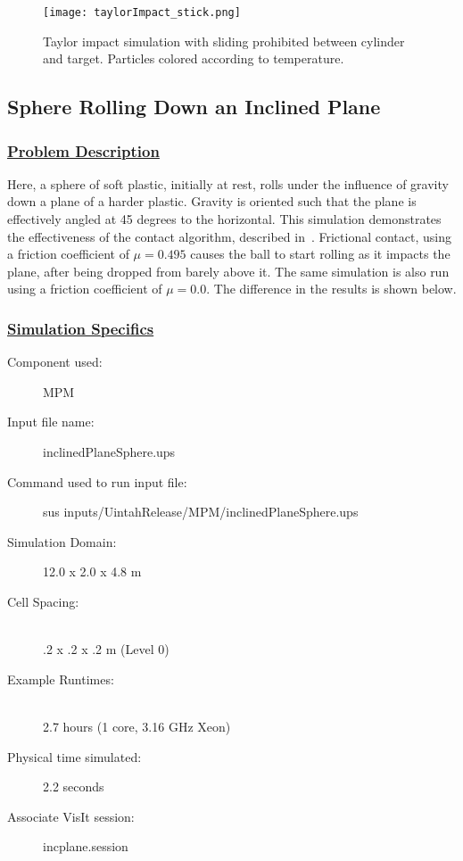 \begin{figure}
  \center
  \texttt{[image: taylorImpact\_stick.png]}
  \caption{Taylor impact simulation with sliding prohibited between
           cylinder and target.  Particles colored according to temperature.}
  \label{fig:taylorImpact_stick}
\end{figure}

\subsection*{\center Sphere Rolling Down an Inclined Plane}
\subsubsection*{\underline{Problem Description}}
Here, a sphere of soft plastic, initially at rest, rolls under the
influence of gravity down a plane of a harder plastic.  Gravity is
oriented such that the plane is effectively angled at 45 degrees to
the horizontal.  This simulation demonstrates the effectiveness of
the contact algorithm, described in~\cite{bard01}.  Frictional
contact, using a friction coefficient of $\mu = 0.495$ causes the ball
to start rolling as it impacts the plane, after being dropped from
barely above it.  The same simulation is also run using a friction
coefficient of $\mu = 0.0$.  The difference in the results is shown
below.
 
\subsubsection*{\underline{Simulation Specifics}}
\begin{description} 
\item [Component used:] \hfill MPM
\item [Input file name:] \hfill inclinedPlaneSphere.ups
\item [Command used to run input file:]\hfill sus inputs/UintahRelease/MPM/inclinedPlaneSphere.ups
\item [Simulation Domain:]\hfill    12.0 x 2.0 x 4.8 m

\item [Cell Spacing:]\hfill \\ 
.2 x .2 x .2 m (Level 0)

\item [Example Runtimes:] \hfill \\
 2.7 hours  (1 core, 3.16 GHz Xeon)\\

\item [Physical time simulated:] \hfill 2.2 seconds

\item [Associate VisIt session:] \hfill incplane.session

\end{description}

